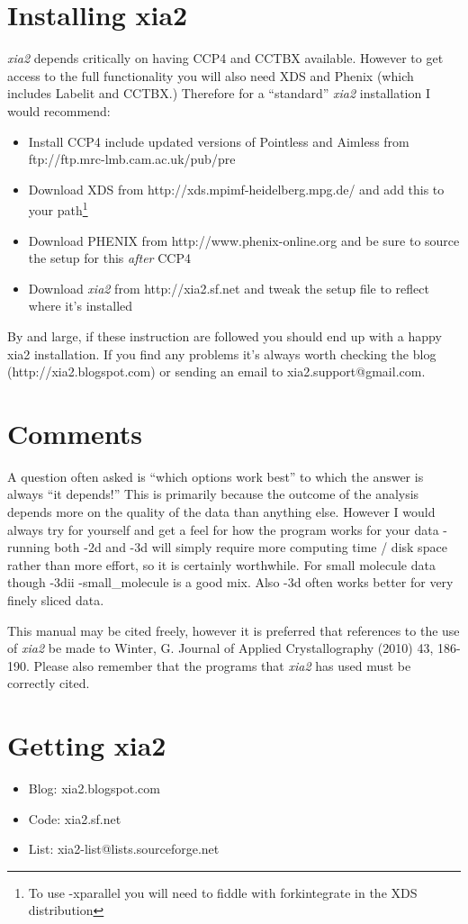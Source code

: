 \documentclass[a4paper, 11pt]{article}
\begin{document}
\section{Installing xia2}

\emph{xia2} depends critically on having CCP4 and CCTBX
available. However to get access to the full functionality you will
also need XDS and Phenix (which includes Labelit and CCTBX.) Therefore
for a ``standard'' \emph{xia2} installation I would recommend:

\begin{itemize}
\item{Install CCP4 include updated versions of Pointless and Aimless
    from ftp://ftp.mrc-lmb.cam.ac.uk/pub/pre}
\item{Download XDS from http://xds.mpimf-heidelberg.mpg.de/ and
    add this to your path\footnote{To use -xparallel you will need to
      fiddle with forkintegrate in the XDS distribution}}
\item{Download PHENIX from http://www.phenix-online.org and be sure to
    source the setup for this \emph{after} CCP4}
\item{Download \emph{xia2} from http://xia2.sf.net and tweak the setup
    file to reflect where it's installed}
\end{itemize}

\noindent
By and large, if these instruction are followed you should end up with
a happy xia2 installation. If you find any problems it's always worth
checking the blog (http://xia2.blogspot.com) or sending an email to
xia2.support@gmail.com.

\section{Comments}

A question often asked is ``which options work best'' to which the
answer is always ``it depends!'' This is primarily because the outcome of
the analysis depends more on the quality of the data than anything
else. However I would always try for yourself and get a feel for how
the program works for your data - running both -2d and -3d will simply
require more computing time / disk space rather than more effort, so
it is certainly worthwhile. For small molecule data though -3dii
-small\_molecule is a good mix. Also -3d often works better for very
finely sliced data.

This manual may be cited freely, however it is preferred that references
to the use of \emph{xia2} be made to Winter, G. Journal of
Applied Crystallography (2010) 43, 186-190. Please also remember that the
programs that \emph{xia2} has used must be correctly cited.

\section{Getting xia2}
\begin{itemize}
\item{Blog: xia2.blogspot.com}
\item{Code: xia2.sf.net}
\item{List: xia2-list@lists.sourceforge.net}
\end{itemize}
\end{document}
